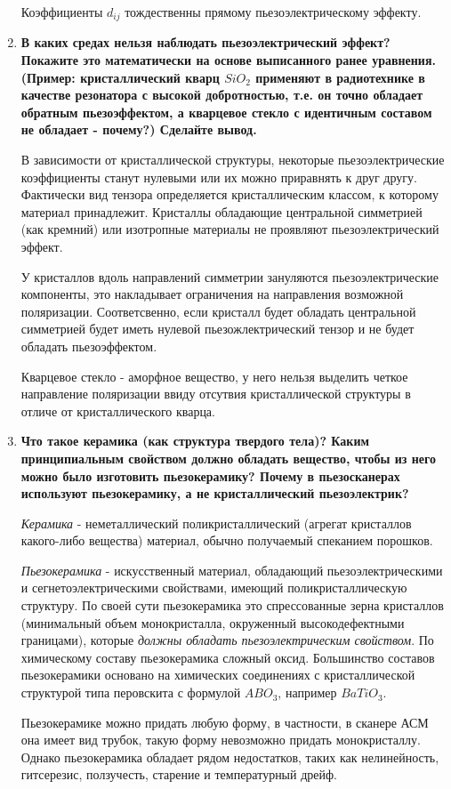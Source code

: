 \documentclass[a4paper]{article}
\begin{document}
\begin{enumerate}
    Коэффициенты $d_{ij}$ тождественны прямому пьезоэлектрическому эффекту. 


    \item \textbf{В каких средах нельзя наблюдать пьезоэлектрический эффект? Покажите это математически на основе выписанного ранее уравнения.
    (Пример: кристаллический кварц $SiO_2$ применяют в радиотехнике в качестве резонатора с высокой добротностью, т.е. он точно обладает обратным пьезоэффектом,
    а кварцевое стекло с идентичным составом не обладает - почему?) Сделайте вывод.} \par 

    В зависимости от кристаллической структуры, некоторые пьезоэлектрические коэффициенты станут нулевыми или их можно приравнять к друг другу. Фактически
    вид тензора определяется кристаллическим классом, к которому материал принадлежит. Кристаллы обладающие центральной симметрией (как кремний) или изотропные 
    материалы не проявляют пьезоэлектрический эффект. \par 
    
    У кристаллов вдоль направлений симметрии зануляются пьезоэлектрические компоненты, это накладывает ограничения на направления возможной поляризации. Соответсвенно, если 
    кристалл будет обладать центральной симметрией будет иметь нулевой пьезожлектрический тензор и не будет обладать пьезоэффектом.

    Кварцевое стекло - аморфное вещество, у него нельзя выделить четкое направление поляризации ввиду отсутвия кристаллической структуры в отличе от кристаллического кварца.

    \item \textbf{Что такое керамика (как структура твердого тела)? Каким принципиальным свойством должно обладать вещество, чтобы из него можно было изготовить 
    пьезокерамику? Почему в пьезосканерах используют пьезокерамику, а не кристаллический пьезоэлектрик?} \par 

    \textit{Керамика} - неметаллический поликристаллический (агрегат кристаллов какого-либо вещества) материал, обычно получаемый спеканием порошков.\par 

    \textit{Пьезокерамика} - искусственный материал, обладающий пьезоэлектрическими и сегнетоэлектрическими свойствами, имеющий поликристаллическую структуру.
    По своей сути пьезокерамика это спрессованные зерна кристаллов (минимальный объем монокристалла, окруженный высокодефектными границами), которые \textit{должны 
    обладать пьезоэлектрическим свойством}. По химическому составу пьезокерамика сложный оксид. Большинство составов пьезокерамики основано на химических 
    соединениях с кристаллической структурой типа перовскита с формулой $ABO_3$, например $BaTiO_3$.\par

    Пьезокерамике можно придать любую форму, в частности, в сканере АСМ она имеет вид трубок, такую форму невозможно придать монокристаллу. Однако пьезокерамика обладает рядом недостатков,
    таких как нелинейность, гитсерезис, ползучесть, старение и температурный дрейф.

\end{enumerate}



	
\end{document}
